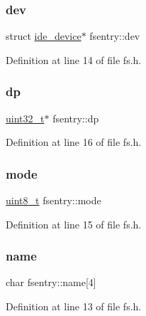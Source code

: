 \subsubsection{\texorpdfstring{dev}{dev}}
{\footnotesize\ttfamily struct \hyperlink{a00224}{ide\+\_\+device}$\ast$ fsentry\+::dev}



Definition at line 14 of file fs.\+h.

\mbox{\label{a00272_ae1d22893563b8753e29fef01f0782ba5_ae1d22893563b8753e29fef01f0782ba5}} 
\subsubsection{\texorpdfstring{dp}{dp}}
{\footnotesize\ttfamily \hyperlink{a00140_a435d1572bf3f880d55459d9805097f62_a435d1572bf3f880d55459d9805097f62}{uint32\+\_\+t}$\ast$ fsentry\+::dp}



Definition at line 16 of file fs.\+h.

\mbox{\label{a00272_a6e71712bc3c51c21dc3362334937e4d7_a6e71712bc3c51c21dc3362334937e4d7}} 
\subsubsection{\texorpdfstring{mode}{mode}}
{\footnotesize\ttfamily \hyperlink{a00140_aba7bc1797add20fe3efdf37ced1182c5_aba7bc1797add20fe3efdf37ced1182c5}{uint8\+\_\+t} fsentry\+::mode}



Definition at line 15 of file fs.\+h.

\mbox{\label{a00272_a9c5a4f5b02eb2c9e9e797f79dc99028a_a9c5a4f5b02eb2c9e9e797f79dc99028a}} 
\subsubsection{\texorpdfstring{name}{name}}
{\footnotesize\ttfamily char fsentry\+::name\mbox{[}4\mbox{]}}



Definition at line 13 of file fs.\+h.

